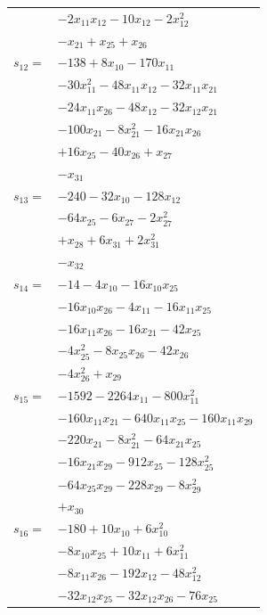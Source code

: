 \begin{longtable}{@{}r@{\;}l@{}}
 & \(\displaystyle -2x_{11}x_{12} -10x_{12} -2x_{12}^{2}\) \\
 & \(\displaystyle -x_{21} +x_{25} +x_{26}\) \\[3pt]
\(s_{12}=\) & \(\displaystyle -138 +8x_{10} -170x_{11}\) \\
 & \(\displaystyle -30x_{11}^{2} -48x_{11}x_{12} -32x_{11}x_{21}\) \\
 & \(\displaystyle -24x_{11}x_{26} -48x_{12} -32x_{12}x_{21}\) \\
 & \(\displaystyle -100x_{21} -8x_{21}^{2} -16x_{21}x_{26}\) \\
 & \(\displaystyle +16x_{25} -40x_{26} +x_{27}\) \\
 & \(\displaystyle -x_{31}\) \\[3pt]
\(s_{13}=\) & \(\displaystyle -240 -32x_{10} -128x_{12}\) \\
 & \(\displaystyle -64x_{25} -6x_{27} -2x_{27}^{2}\) \\
 & \(\displaystyle +x_{28} +6x_{31} +2x_{31}^{2}\) \\
 & \(\displaystyle -x_{32}\) \\[3pt]
\(s_{14}=\) & \(\displaystyle -14 -4x_{10} -16x_{10}x_{25}\) \\
 & \(\displaystyle -16x_{10}x_{26} -4x_{11} -16x_{11}x_{25}\) \\
 & \(\displaystyle -16x_{11}x_{26} -16x_{21} -42x_{25}\) \\
 & \(\displaystyle -4x_{25}^{2} -8x_{25}x_{26} -42x_{26}\) \\
 & \(\displaystyle -4x_{26}^{2} +x_{29}\) \\[3pt]
\(s_{15}=\) & \(\displaystyle -1592 -2264x_{11} -800x_{11}^{2}\) \\
 & \(\displaystyle -160x_{11}x_{21} -640x_{11}x_{25} -160x_{11}x_{29}\) \\
 & \(\displaystyle -220x_{21} -8x_{21}^{2} -64x_{21}x_{25}\) \\
 & \(\displaystyle -16x_{21}x_{29} -912x_{25} -128x_{25}^{2}\) \\
 & \(\displaystyle -64x_{25}x_{29} -228x_{29} -8x_{29}^{2}\) \\
 & \(\displaystyle +x_{30}\) \\[3pt]
\(s_{16}=\) & \(\displaystyle -180 +10x_{10} +6x_{10}^{2}\) \\
 & \(\displaystyle -8x_{10}x_{25} +10x_{11} +6x_{11}^{2}\) \\
 & \(\displaystyle -8x_{11}x_{26} -192x_{12} -48x_{12}^{2}\) \\
 & \(\displaystyle -32x_{12}x_{25} -32x_{12}x_{26} -76x_{25}\) \\

\end{longtable}
